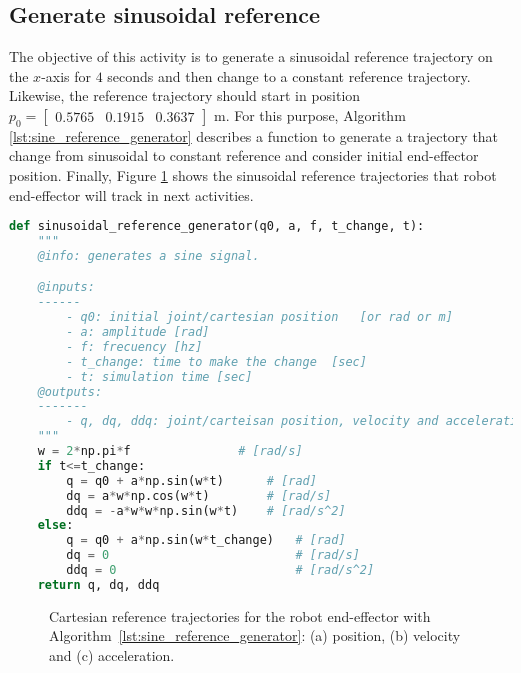 \graphicspath{{images/act_1.1/}}
\subsection{Generate sinusoidal reference}
\label{subsec:generate_sinusoidal_reference}
The objective of this activity is to generate a sinusoidal reference trajectory on the $x$-axis for $4$ seconds and then change to a constant reference trajectory. Likewise, the reference trajectory should start in position $p_0=\begin{bmatrix}  0.5765 &   0.1915 &   0.3637 \end{bmatrix}$ m. For this purpose, Algorithm \ref{lst:sine_reference_generator} describes a function to generate a trajectory that change from sinusoidal to constant reference and consider initial end-effector position. Finally, Figure \ref{fig:act_1.1_sin_reference} shows the sinusoidal reference trajectories that robot end-effector will track in next activities. \vspace{.5cm}

\begin{lstlisting}[language=Python,caption=Function to generate a sinusoidal reference trajectory for some seconds and then change to a constant reference trajectory., label={lst:sine_reference_generator}]
def sinusoidal_reference_generator(q0, a, f, t_change, t):
    """
    @info: generates a sine signal.

    @inputs: 
    ------
        - q0: initial joint/cartesian position   [or rad or m]
        - a: amplitude [rad]
        - f: frecuency [hz]
        - t_change: time to make the change  [sec]
        - t: simulation time [sec]
    @outputs:
    -------
        - q, dq, ddq: joint/carteisan position, velocity and acceleration
    """
    w = 2*np.pi*f               # [rad/s]
    if t<=t_change:
        q = q0 + a*np.sin(w*t)      # [rad]
        dq = a*w*np.cos(w*t)        # [rad/s]
        ddq = -a*w*w*np.sin(w*t)    # [rad/s^2]
    else:
        q = q0 + a*np.sin(w*t_change)   # [rad]
        dq = 0                          # [rad/s]
        ddq = 0                         # [rad/s^2]
    return q, dq, ddq
\end{lstlisting}

\vspace*{0cm}
\begin{figure}
	\centering
	\hfill
	\hfill
	\caption{Cartesian reference trajectories for the robot end-effector with Algorithm~\ref{lst:sine_reference_generator}: (a) position, (b) velocity and (c) acceleration.}
	\label{fig:act_1.1_sin_reference}
\end{figure}
